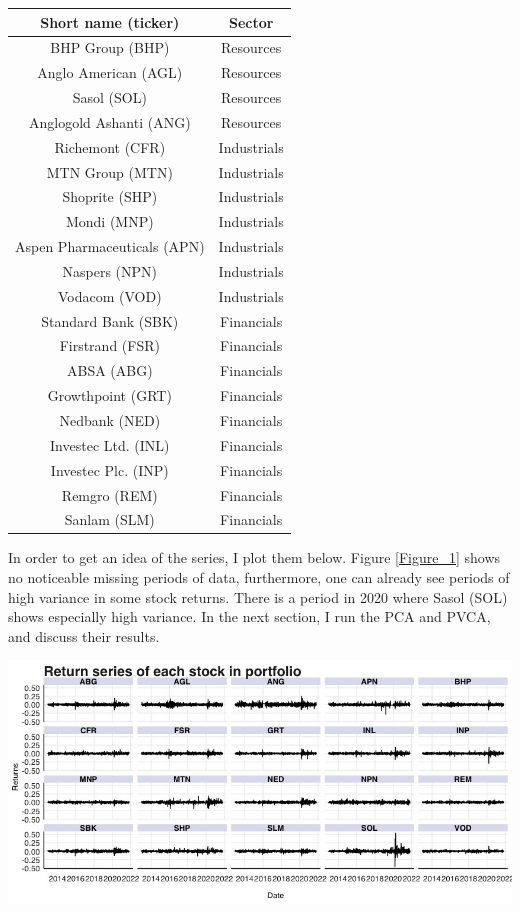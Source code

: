 \documentclass[11pt,preprint, authoryear]{elsarticle}
\let\origfigure\figure
\let\endorigfigure\endfigure
\renewenvironment{figure}[1][2] {
    \expandafter\origfigure\expandafter[H]
} {
    \endorigfigure
}
\let\origtable\table
\let\endorigtable\endtable
\renewenvironment{table}[1][2] {
    \expandafter\origtable\expandafter[H]
} {
    \endorigtable
}
\numberwithin{equation}{section}
\numberwithin{figure}{section}
\numberwithin{table}{section}
\begin{document}
\begin{table}[h!]
\centering
\begin{tabular}{|c c|}
\hline
Short name (ticker) & Sector \\
\hline\hline 
BHP Group (BHP) & Resources \\
Anglo American (AGL) & Resources \\
Sasol (SOL) & Resources \\
Anglogold Ashanti (ANG) & Resources \\
Richemont (CFR) & Industrials \\
MTN Group (MTN) & Industrials \\
Shoprite (SHP) & Industrials \\
Mondi (MNP) & Industrials \\
Aspen Pharmaceuticals (APN) & Industrials \\
Naspers (NPN) & Industrials \\
Vodacom (VOD) & Industrials \\
Standard Bank (SBK) & Financials \\
Firstrand (FSR) & Financials \\
ABSA (ABG) & Financials \\
Growthpoint (GRT) & Financials \\
Nedbank (NED) & Financials \\
Investec Ltd. (INL) & Financials \\
Investec Plc. (INP) & Financials \\
Remgro (REM) & Financials \\
Sanlam (SLM) & Financials \\ [1ex] 
\hline
\end{tabular}
\caption{Portfolio of 20 stocks}
\end{table}

In order to get an idea of the series, I plot them below. Figure
\ref{Figure_1} shows no noticeable missing periods of data, furthermore,
one can already see periods of high variance in some stock returns.
There is a period in 2020 where Sasol (SOL) shows especially high
variance. In the next section, I run the PCA and PVCA, and discuss their
results.

\begin{figure}[!htb]
\centering
\includegraphics[scale=0.6]{figures/Figure_1.jpeg}
\caption{Stock returns of the portoflio}\label{Figure_1}
\end{figure}
\end{document}
